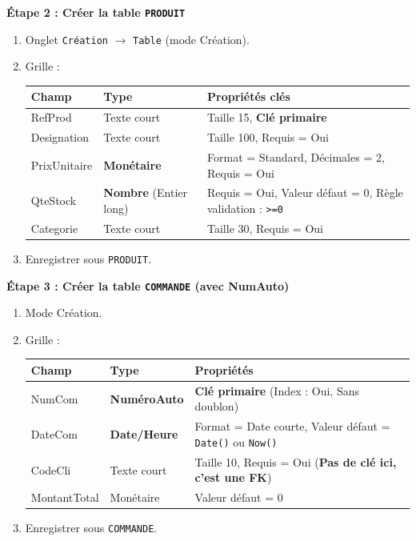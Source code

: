 \documentclass[11pt]{article}
\begin{document}
\begin{experience}
\textbf{Étape 2 : Créer la table \texttt{PRODUIT}}
\begin{enumerate}
    \item Onglet \texttt{Création} $\rightarrow$ \texttt{Table} (mode Création).
    \item Grille :
    \begin{center}
    \begin{tabular}{|l|l|l|}
    \hline \textbf{Champ} & \textbf{Type} & \textbf{Propriétés clés} \\ \hline
    RefProd & Texte court & Taille 15, \textbf{Clé primaire} \\
    Designation & Texte court & Taille 100, Requis = Oui \\
    PrixUnitaire & \textbf{Monétaire} & Format = Standard, Décimales = 2, Requis = Oui \\
    QteStock & \textbf{Nombre} (Entier long) & Requis = Oui, Valeur défaut = 0, Règle validation : \texttt{>=0} \\
    Categorie & Texte court & Taille 30, Requis = Oui \\ \hline
    \end{tabular}
    \end{center}
    \item Enregistrer sous \texttt{PRODUIT}.
\end{enumerate}

\textbf{Étape 3 : Créer la table \texttt{COMMANDE} (avec NumAuto)}
\begin{enumerate}
    \item Mode Création.
    \item Grille :
    \begin{center}
    \begin{tabular}{|l|l|l|}
    \hline \textbf{Champ} & \textbf{Type} & \textbf{Propriétés} \\ \hline
    NumCom & \textbf{NuméroAuto} & \textbf{Clé primaire} (Index : Oui, Sans doublon) \\
    DateCom & \textbf{Date/Heure} & Format = Date courte, Valeur défaut = \texttt{Date()} ou \texttt{Now()} \\
    CodeCli & Texte court & Taille 10, Requis = Oui \quad (\textbf{Pas de clé ici, c'est une FK}) \\
    MontantTotal & Monétaire & Valeur défaut = 0 \\ \hline
    \end{tabular}
    \end{center}
    \item Enregistrer sous \texttt{COMMANDE}.
\end{enumerate}


\end{experience}
\end{document}
